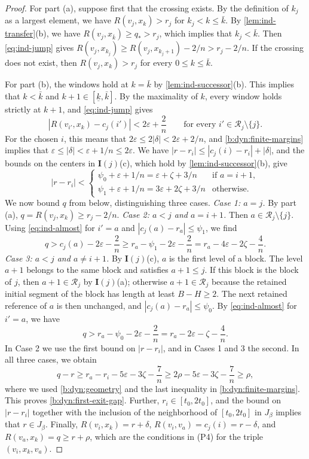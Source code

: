 \begin{proof}
For part (a), suppose first that the crossing exists. By the definition of $k_j$ as a largest element, we have $R(v_j,x_k)>r_j$ for $k_j<k\le {\bar k}$. By \cref{lem:ind-transfer}(b), we have $R(v_j,x_{\bar k})\ge q_*>r_j$, which implies that $k_j<{\bar k}$. Then \eqref{eq:ind-jump} gives $R(v_j,x_{k_j})\ge R(v_j,x_{k_j+1})-2/n>r_j-2/n$. If the crossing does not exist, then $R(v_j,x_k)>r_j$ for every $0\le k\le {\bar k}$.

For part (b), the windows hold at $k={\bar k}$ by \cref{lem:ind-successor}(b). This implies that $k<{\bar k}$ and $k+1\in[\underline k,{\bar k}]$. By the maximality of $k$, every window holds strictly at $k+1$, and \eqref{eq:ind-jump} gives
\begin{equation}\label{eq:ind-almost}
 |R(v_{i'},x_k)-c_j(i')|<2\varepsilon+\frac2n\qquad\text{for every }i'\in\mathcal R_j\setminus\{j\}.
\end{equation}
For the chosen $i$, this means that $2\varepsilon\le2|\delta|<2\varepsilon+2/n$, and \eqref{b:dyn:finite-margins} implies that $\varepsilon\le|\delta|<\varepsilon+1/n\le2\varepsilon$. We have $|r-r_i|\le|c_j(i)-r_i|+|\delta|$, and the bounds on the centers in $\mathbf I(j)$(c), which hold by \cref{lem:ind-successor}(b), give
\[
 |r-r_i|<
 \begin{cases}
 \psi_0+\varepsilon+1/n=\varepsilon+\zeta+3/n&\text{if $a=i+1$},\\
 \psi_1+\varepsilon+1/n=3\varepsilon+2\zeta+3/n&\text{otherwise}.
 \end{cases}
\]
We now bound $q$ from below, distinguishing three cases.
\emph{Case 1: $a=j$.} By part (a), $q=R(v_j,x_k)\ge r_j-2/n$.
\emph{Case 2: $a<j$ and $a=i+1$.} Then $a\in\mathcal R_j\setminus\{j\}$. Using \eqref{eq:ind-almost} for $i'=a$ and $|c_j(a)-r_a|\le\psi_1$, we find
\[
 q>c_j(a)-2\varepsilon-\frac2n\ge r_a-\psi_1-2\varepsilon-\frac2n=r_a-4\varepsilon-2\zeta-\frac4n.
\]
\emph{Case 3: $a<j$ and $a\neq i+1$.} By $\mathbf I(j)$(c), $a$ is the first level of a block. The level $a+1$ belongs to the same block and satisfies $a+1\le j$. If this block is the block of $j$, then $a+1\in\mathcal R_j$ by $\mathbf I(j)$(a); otherwise $a+1\in\mathcal R_j$ because the retained initial segment of the block has length at least $B-H\ge2$. The next retained reference of $a$ is then unchanged, and $|c_j(a)-r_a|\le\psi_0$. By \eqref{eq:ind-almost} for $i'=a$, we have
\[
 q>r_a-\psi_0-2\varepsilon-\frac2n=r_a-2\varepsilon-\zeta-\frac4n.
\]
In Case 2 we use the first bound on $|r-r_i|$, and in Cases 1 and 3 the second. In all three cases, we obtain
\[
 q-r\ge r_a-r_i-5\varepsilon-3\zeta-\frac7n\ge2\rho-5\varepsilon-3\zeta-\frac7n\ge\rho,
\]
where we used \eqref{b:dyn:geometry} and the last inequality in \eqref{b:dyn:finite-margins}. This proves \eqref{b:dyn:first-exit-gap}. Further, $r_i\in[t_0,2t_0]$, and the bound on $|r-r_i|$ together with the inclusion of the neighborhood of $[t_0,2t_0]$ in $J_\beta$ implies that $r\in J_\beta$. Finally, $R(v_i,x_k)=r+\delta$, $R(v_i,v_a)=c_j(i)=r-\delta$, and $R(v_a,x_k)=q\ge r+\rho$, which are the conditions in (P4) for the triple $(v_i,x_k,v_a)$.


\end{proof}
